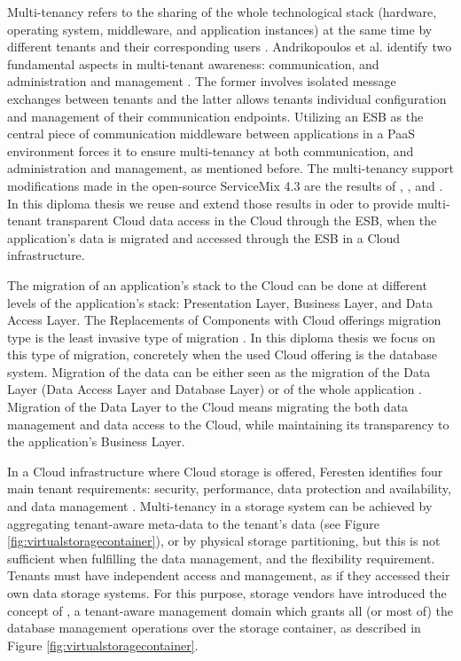 Multi-tenancy refers to the sharing of the whole technological stack (hardware, operating system, middleware, and application instances) at the same time by different tenants and their corresponding users \cite{EnablingMT}. Andrikopoulos et al. identify two fundamental aspects in multi-tenant awareness: communication, and administration and management \cite{andrikopoulos2013}. The former involves isolated message exchanges between tenants and the latter allows tenants individual configuration and management of their communication endpoints. Utilizing an \ac{ESB} as the central piece of communication middleware between applications in a \ac{PaaS} environment forces it to ensure multi-tenancy at both communication, and administration and management, as mentioned before. The multi-tenancy support modifications made in the open-source ServiceMix 4.3 are the results of \cite{Essl2011}, \cite{Muhler2012}, and \cite{gomez2012}. In this diploma thesis we reuse and extend those results in oder to provide multi-tenant transparent Cloud data access in the Cloud through the \ac{ESB}, when the application's data is migrated and accessed through the \ac{ESB} in a Cloud infrastructure.

The migration of an application's stack to the Cloud can be done at different levels of the application's stack: Presentation Layer, Business Layer, and Data Access Layer. The Replacements of Components with Cloud offerings migration type is the least invasive type of migration \cite{andrikopoulos2013}. In this diploma thesis we focus on this type of migration, concretely when the used Cloud offering is the database system. Migration of the data can be either seen as the migration of the Data Layer (Data Access Layer and Database Layer) or of the whole application \cite{andrikopoulos2013}. Migration of the Data Layer to the Cloud means migrating the both data management and data access to the Cloud, while maintaining its transparency to the application's Business Layer. 

In a Cloud infrastructure where Cloud storage is offered, Feresten identifies four main tenant requirements: security, performance, data protection and availability, and data management \cite{feresten2010}. Multi-tenancy in a storage system can be achieved by aggregating tenant-aware meta-data to the tenant's data (see Figure \ref{fig:virtualstoragecontainer}), or by physical storage partitioning, but this is not sufficient when fulfilling the data management, and the flexibility requirement. Tenants must have independent access and management, as if they accessed their own data storage systems. For this purpose, storage vendors have introduced the concept of , a tenant-aware management domain which grants all (or most of) the database management operations over the storage container, as described in Figure \ref{fig:virtualstoragecontainer}.

